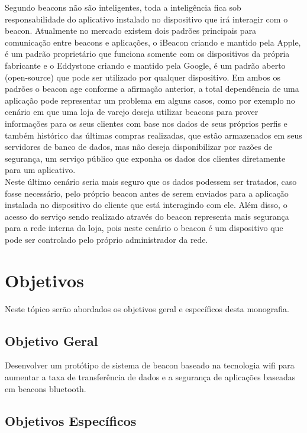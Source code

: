 Segundo \cite{Teixeira} beacons não são inteligentes, toda a inteligência fica sob responsabilidade do aplicativo instalado no dispositivo que irá interagir com o beacon. Atualmente no mercado existem dois padrões principais para comunicação entre beacons e aplicações, o iBeacon criando e mantido pela Apple, é um padrão proprietário que funciona somente com os dispositivos da própria fabricante e o Eddystone criando e mantido pela Google, é um padrão aberto (open-source) que pode ser utilizado por qualquer dispositivo. Em ambos os padrões o beacon age conforme a afirmação anterior, a total dependência de uma aplicação pode representar um problema em alguns casos, como por exemplo no cenário em que uma loja de varejo deseja utilizar beacons para prover informações para os seus clientes com base nos dados de seus próprios perfis e também histórico das últimas compras realizadas, que estão armazenados em seus servidores de banco de dados, mas não deseja disponibilizar por razões de segurança, um serviço público que exponha os dados dos clientes diretamente para um aplicativo. \\
\indent Neste último cenário seria mais seguro que os dados podessem ser tratados, caso fosse necessário, pelo próprio beacon antes de serem enviados para a aplicação instalada no dispositivo do cliente que está interagindo com ele. Além disso, o acesso do serviço sendo realizado através do beacon representa mais segurança para a rede interna da loja, pois neste cenário o beacon é um dispositivo que pode ser controlado pelo próprio administrador da rede.

\section{Objetivos}
\label{sec:objetivos}

Neste tópico serão abordados os objetivos geral e específicos desta monografia.

\subsection{Objetivo Geral}
\label{sec:objetivo-geral}

Desenvolver um protótipo de sistema de beacon baseado na tecnologia wifi para aumentar a taxa de transferência de dados e a segurança de aplicações baseadas em beacons bluetooth.

\subsection{Objetivos Específicos}
\label{sec:objetivos-especificos}

